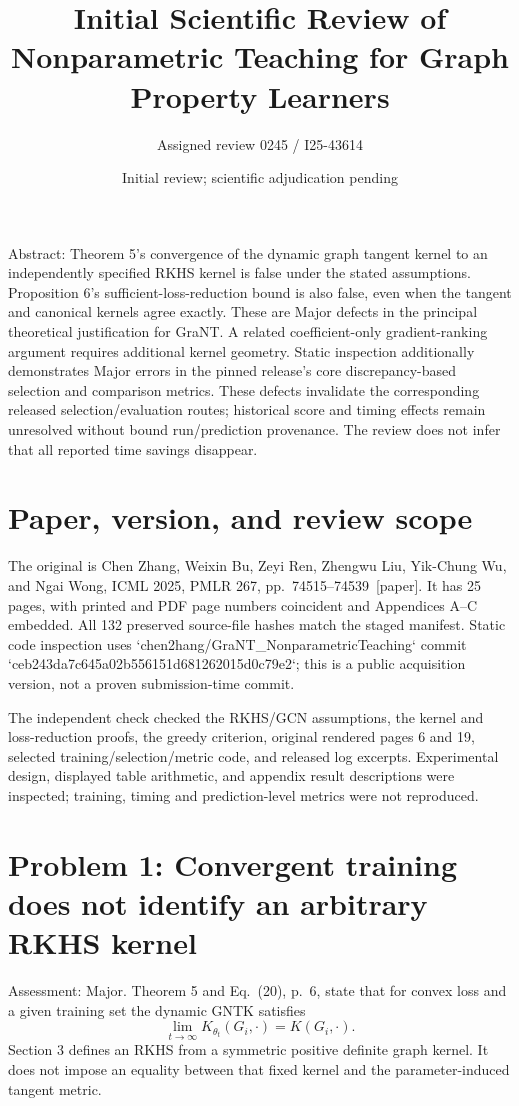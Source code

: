 \documentclass[10pt]{article}
\title{Initial Scientific Review of
Nonparametric Teaching for Graph Property Learners}
\author{Assigned review 0245 / I25-43614}
\date{Initial review; scientific adjudication pending}
\begin{document}
\maketitle
Abstract: Theorem 5’s convergence of the dynamic graph tangent kernel to an independently specified RKHS kernel is false under the stated assumptions. Proposition 6’s sufficient-loss-reduction bound is also false, even when the tangent and canonical kernels agree exactly. These are Major defects in the principal theoretical justification for GraNT. A related coefficient-only gradient-ranking argument requires additional kernel geometry. Static inspection additionally demonstrates Major errors in the pinned release’s core discrepancy-based selection and comparison metrics. These defects invalidate the corresponding released selection/evaluation routes; historical score and timing effects remain unresolved without bound run/prediction provenance. The review does not infer that all reported time savings disappear.\par
\section*{Paper, version, and review scope}
The original is Chen Zhang, Weixin Bu, Zeyi Ren, Zhengwu Liu, Yik-Chung Wu, and Ngai Wong, ICML 2025, PMLR 267, pp. 74515–74539 [paper]. It has 25 pages, with printed and PDF page numbers coincident and Appendices A–C embedded. All 132 preserved source-file hashes match the staged manifest. Static code inspection uses `chen2hang/GraNT\_NonparametricTeaching` commit `ceb243da7c645a02b556151d681262015d0c79e2`; this is a public acquisition version, not a proven submission-time commit.\par
The independent check checked the RKHS/GCN assumptions, the kernel and loss-reduction proofs, the greedy criterion, original rendered pages 6 and 19, selected training/selection/metric code, and released log excerpts. Experimental design, displayed table arithmetic, and appendix result descriptions were inspected; training, timing and prediction-level metrics were not reproduced.\par
\section*{Problem 1: Convergent training does not identify an arbitrary RKHS kernel}
Assessment: Major. Theorem 5 and Eq. (20), p. 6, state that for convex loss and a given training set the dynamic GNTK satisfies \[\lim_{t\to\infty}K_{\theta_t}(G_i,\cdot)=K(G_i,\cdot).\] Section 3 defines an RKHS from a symmetric positive definite graph kernel. It does not impose an equality between that fixed kernel and the parameter-induced tangent metric.\par
\end{document}

